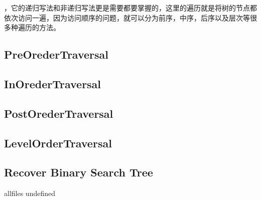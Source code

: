 \documentclass{article}
\begin{document}
\begin{CJK}{UTF8}{gbsn}     %

\else
	
，它的递归写法和非递归写法更是需要都要掌握的，这里的遍历就是将树的节点都依次访问一遍，因为访问顺序的问题，就可以分为前序，中序，后序以及层次等很多种遍历的方法。
\subsection{PreOrederTraversal}

\subsection{InOrederTraversal}

\subsection{PostOrederTraversal}

\subsection{LevelOrderTraversal}

\subsection{Recover Binary Search Tree }


\fi

\ifx allfiles undefined
\end{CJK}
\end{document}
